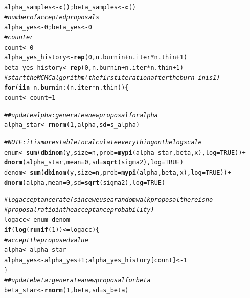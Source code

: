 \documentclass{article}\usepackage[]{graphicx}\usepackage[]{xcolor}
\makeatletter
\newcommand{\hlnum}[1]{\textcolor[rgb]{0.686,0.059,0.569}{#1}}%
\newcommand{\hlcom}[1]{\textcolor[rgb]{0.678,0.584,0.686}{\textit{#1}}}%
\newcommand{\hlopt}[1]{\textcolor[rgb]{0,0,0}{#1}}%
\newcommand{\hlstd}[1]{\textcolor[rgb]{0.345,0.345,0.345}{#1}}%
\newcommand{\hlkwa}[1]{\textcolor[rgb]{0.161,0.373,0.58}{\textbf{#1}}}%
\newcommand{\hlkwb}[1]{\textcolor[rgb]{0.69,0.353,0.396}{#1}}%
\newcommand{\hlkwc}[1]{\textcolor[rgb]{0.333,0.667,0.333}{#1}}%
\newcommand{\hlkwd}[1]{\textcolor[rgb]{0.737,0.353,0.396}{\textbf{#1}}}%
\newenvironment{kframe}{%
 \def\at@end@of@kframe{}%
 \ifinner\ifhmode%
  \def\at@end@of@kframe{\end{minipage}}%
  \begin{minipage}{\columnwidth}%
 \fi\fi%
 \def\FrameCommand##1{\hskip\@totalleftmargin \hskip-\fboxsep
 \colorbox{shadecolor}{##1}\hskip-\fboxsep
     \hskip-\linewidth \hskip-\@totalleftmargin \hskip\columnwidth}%
 \MakeFramed {\advance\hsize-\width
   \@totalleftmargin\z@ \linewidth\hsize
   \@setminipage}}%
 {\par\unskip\endMakeFramed%
 \at@end@of@kframe}
\newenvironment{knitrout}{}{} %
\makeatother
\begin{document}
\begin{multicols*}{2}
\begin{knitrout}
\begin{kframe}
\begin{alltt}
  \hlstd{alpha_samples} \hlkwb{<-} \hlkwd{c}\hlstd{();beta_samples} \hlkwb{<-} \hlkwd{c}\hlstd{()}
  \hlcom{# number of accepted proposals}
  \hlstd{alpha_yes} \hlkwb{<-} \hlnum{0}\hlstd{;beta_yes} \hlkwb{<-} \hlnum{0}
  \hlcom{# counter}
  \hlstd{count} \hlkwb{<-} \hlnum{0}
  \hlstd{alpha_yes_history} \hlkwb{<-} \hlkwd{rep}\hlstd{(}\hlnum{0}\hlstd{, n.burnin}\hlopt{+}\hlstd{n.iter}\hlopt{*}\hlstd{n.thin}\hlopt{+}\hlnum{1}\hlstd{)}
  \hlstd{beta_yes_history} \hlkwb{<-} \hlkwd{rep}\hlstd{(}\hlnum{0}\hlstd{, n.burnin}\hlopt{+}\hlstd{n.iter}\hlopt{*}\hlstd{n.thin}\hlopt{+}\hlnum{1}\hlstd{)}
  \hlcom{# start the MCMC algorithm (the first iteration after the burn-in is 1)}
  \hlkwa{for}\hlstd{(i} \hlkwa{in} \hlopt{-}\hlstd{n.burnin}\hlopt{:}\hlstd{(n.iter}\hlopt{*}\hlstd{n.thin))\{}
    \hlstd{count} \hlkwb{<-} \hlstd{count} \hlopt{+} \hlnum{1}

    \hlcom{## update alpha: generate a new proposal for alpha}
    \hlstd{alpha_star} \hlkwb{<-} \hlkwd{rnorm}\hlstd{(}\hlnum{1}\hlstd{, alpha,} \hlkwc{sd}\hlstd{=s_alpha)}

    \hlcom{# NOTE: it is more stable to calculate everything on the log scale}
    \hlstd{enum}\hlkwb{<-}\hlkwd{sum}\hlstd{(}\hlkwd{dbinom}\hlstd{(y,}\hlkwc{size}\hlstd{=n,}\hlkwc{prob}\hlstd{=}\hlkwd{mypi}\hlstd{(alpha_star,beta,x),}\hlkwc{log}\hlstd{=}\hlnum{TRUE}\hlstd{))} \hlopt{+}
      \hlkwd{dnorm}\hlstd{(alpha_star,} \hlkwc{mean}\hlstd{=}\hlnum{0}\hlstd{,} \hlkwc{sd}\hlstd{=}\hlkwd{sqrt}\hlstd{(sigma2),} \hlkwc{log}\hlstd{=}\hlnum{TRUE}\hlstd{)}
    \hlstd{denom}\hlkwb{<-}\hlkwd{sum}\hlstd{(}\hlkwd{dbinom}\hlstd{(y,}\hlkwc{size}\hlstd{=n,}\hlkwc{prob}\hlstd{=}\hlkwd{mypi}\hlstd{(alpha,beta,x),}\hlkwc{log}\hlstd{=}\hlnum{TRUE}\hlstd{))}\hlopt{+}
      \hlkwd{dnorm}\hlstd{(alpha,} \hlkwc{mean}\hlstd{=}\hlnum{0}\hlstd{,} \hlkwc{sd}\hlstd{=}\hlkwd{sqrt}\hlstd{(sigma2),} \hlkwc{log}\hlstd{=}\hlnum{TRUE}\hlstd{)}

    \hlcom{# log acceptance rate (since we use a random walk proposal there is no}
    \hlcom{#	proposal ratio in the acceptance probability)}
    \hlstd{logacc} \hlkwb{<-} \hlstd{enum} \hlopt{-} \hlstd{denom}
    \hlkwa{if}\hlstd{(}\hlkwd{log}\hlstd{(}\hlkwd{runif}\hlstd{(}\hlnum{1}\hlstd{))} \hlopt{<=} \hlstd{logacc)\{}
      \hlcom{# accept the proposed value}
      \hlstd{alpha} \hlkwb{<-} \hlstd{alpha_star}
      \hlstd{alpha_yes} \hlkwb{<-} \hlstd{alpha_yes} \hlopt{+} \hlnum{1}\hlstd{; alpha_yes_history[count]} \hlkwb{<-} \hlnum{1}
    \hlstd{\}}
    \hlcom{## update beta: generate a new proposal for beta}
    \hlstd{beta_star} \hlkwb{<-} \hlkwd{rnorm}\hlstd{(}\hlnum{1}\hlstd{, beta,} \hlkwc{sd}\hlstd{=s_beta)}


\end{alltt}
\end{kframe}
\end{knitrout}
\end{multicols*}
\end{document}
